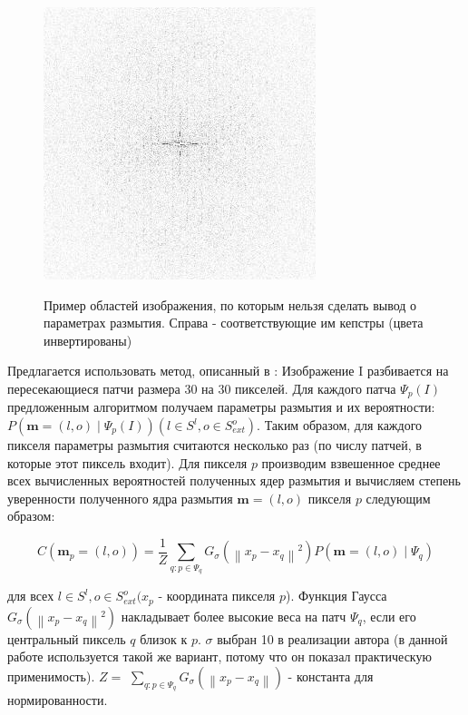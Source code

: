\begin{figure}[H]
\begin{minipage}[h]{0.45\linewidth}
\end{minipage}
\hfill
\begin{minipage}[h]{0.45\linewidth}
\includegraphics[width=0.5\linewidth, left]{pics/synth_blur/i2.png} \\
\end{minipage}

\caption{Пример областей изображения, по которым нельзя сделать вывод о параметрах размытия. Справа - соответствующие им кепстры (цвета инвертированы)}
\label{ris:bad_ceps}
\end{figure}

Предлагается использовать метод, описанный в \cite{sun}:
Изображение I разбивается на пересекающиеся патчи размера 30 на 30 пикселей. Для каждого патча $\Psi_{p}(I)$ предложенным алгоритмом получаем параметры размытия и их вероятности: $P\left(\mathbf{m}=(l, o) \mid \Psi_{p}(I)\right)\left(l \in S^{l}, o \in S_{e x t}^{o}\right)$. Таким образом, для каждого пикселя параметры размытия считаются несколько раз (по числу патчей, в которые этот пиксель входит).
Для пикселя $p$ производим взвешенное среднее всех вычисленных вероятностей полученных ядер размытия и вычисляем степень уверенности полученного ядра размытия $\mathbf{m}=(l, o)$ пикселя $p$ следующим образом:

$$
C\left(\mathbf{m}_{p}=(l, o)\right)= \frac{1}{Z} \sum_{q: p \in \Psi_{q}} G_{\sigma}\left(\left\|x_{p}-x_{q}\right\|^{2}\right) P\left(\mathbf{m}=(l, o) \mid \Psi_{q}\right)
$$

для всех $l \in S^{l}, o \in S_{e x t}^{o} (x_{p}$ - координата пикселя $p$). Функция Гаусса $G_{\sigma}\left(\left\|x_{p}-x_{q}\right\|^{2}\right)$ накладывает более высокие веса на патч $\Psi_{q}$, если его центральный пиксель $q$ близок к $p$. $\sigma$ выбран 10 в реализации автора (в данной работе используется такой же вариант, потому что он показал практическую применимость). $Z=$ $\sum_{q: p \in \Psi_{q}} G_{\sigma}\left(\left\|x_{p}-x_{q}\right\|\right)$ - константа для нормированности.

